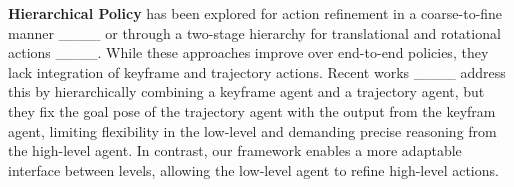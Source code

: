 

\textbf{Hierarchical Policy} has been explored for action refinement in a coarse-to-fine manner ____ or through a two-stage hierarchy for translational and rotational actions ____. While these approaches improve over end-to-end policies, they lack integration of keyframe and trajectory actions. Recent works ____ address this by hierarchically combining a keyframe agent and a trajectory agent, but they fix the goal pose of the trajectory agent with the output from the keyfram agent, limiting  flexibility in the low-level and demanding precise reasoning from the high-level agent. In contrast, our framework enables a more adaptable interface between levels, allowing the low-level agent to refine high-level actions.


